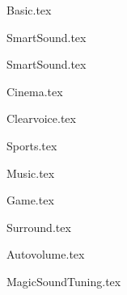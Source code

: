 {Basic.tex}

{SmartSound.tex}

{SmartSound.tex}

{Cinema.tex}

{Clearvoice.tex}

{Sports.tex}

{Music.tex}

{Game.tex}

{Surround.tex}



{Autovolume.tex}




{MagicSoundTuning.tex}